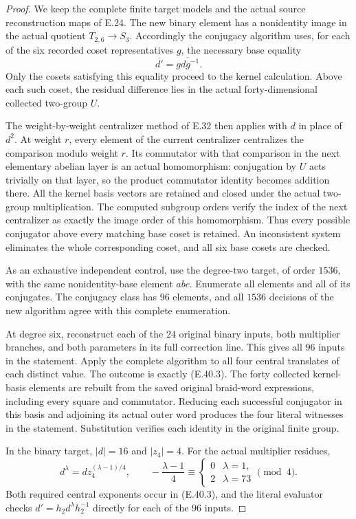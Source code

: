 \begin{proof}
We keep the complete finite target models and
the actual source reconstruction maps of E.24.
The new binary element has a nonidentity image
in the actual quotient $T_{2,6}\to S_3$.
Accordingly the conjugacy algorithm uses, for
each of the six recorded coset representatives $g$,
the necessary base equality
\[
                 \overline{d'}=\overline{g d g^{-1}}.
 \tag{E.40.5}
\]
Only the cosets satisfying this equality proceed
to the kernel calculation.  Above each such coset,
the residual difference lies in the actual
forty-dimensional collected two-group $U$.

The weight-by-weight centralizer method of E.32
then applies with $d$ in place of $d^2$.
At weight $r$, every element of the current
centralizer centralizes the comparison modulo
weight $r$.  Its commutator with that comparison
in the next elementary abelian layer is an
actual homomorphism: conjugation by $U$ acts
trivially on that layer, so the product
commutator identity becomes addition there.
All the kernel basis vectors are retained and
closed under the actual two-group multiplication.
The computed subgroup orders verify the index
of the next centralizer as exactly the image
order of this homomorphism.  Thus every possible
conjugator above every matching base coset is
retained.  An inconsistent system eliminates
the whole corresponding coset, and all six
base cosets are checked.

As an exhaustive independent control, use the
degree-two target, of order $1536$, with the
same nonidentity-base element $abc$.
Enumerate all elements and all of its conjugates.
The conjugacy class has $96$ elements, and all
$1536$ decisions of the new algorithm agree
with this complete enumeration.

At degree six, reconstruct each of the $24$
original binary inputs, both multiplier branches,
and both parameters in its full correction line.
This gives all $96$ inputs in the statement.
Apply the complete algorithm to all four central
translates of each distinct value.  The outcome
is exactly \textup{(E.40.3)}.
The forty collected kernel-basis elements are
rebuilt from the saved original braid-word
expressions, including every square and commutator.
Reducing each successful conjugator in this
basis and adjoining its actual outer word
produces the four literal witnesses in the
statement.  Substitution verifies each identity
in the original finite group.

In the binary target, $|d|=16$ and $|z_4|=4$.
For the actual multiplier residues,
\[
 d^\lambda=d z_4^{(\lambda-1)/4},\qquad
 -\frac{\lambda-1}{4}\equiv
       \begin{cases}0&\lambda=1,\\2&\lambda=73\end{cases}
                                          \pmod4.
 \tag{E.40.6}
\]
Both required central exponents occur in
\textup{(E.40.3)}, and the literal evaluator
checks $d'=h_2d^\lambda h_2^{-1}$ directly
for each of the $96$ inputs.


\end{proof}
